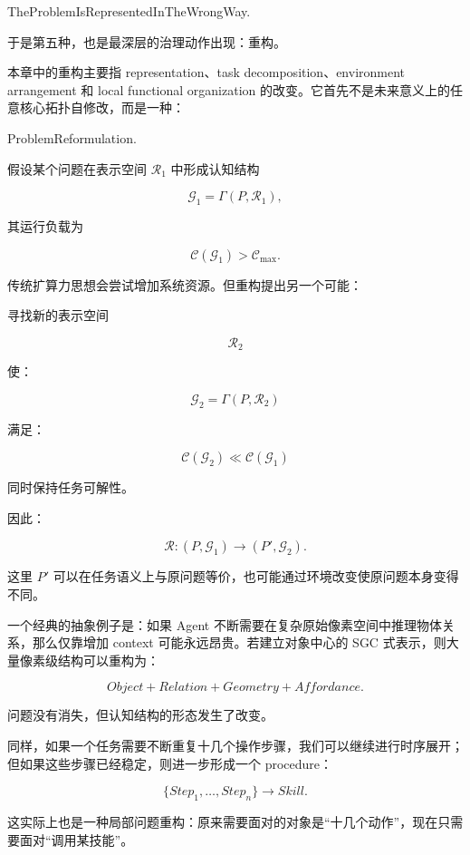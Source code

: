 \begin{statementbox}
TheProblemIsRepresentedInTheWrongWay.
\end{statementbox}

于是第五种，也是最深层的治理动作出现：重构。

本章中的重构主要指 representation、task decomposition、environment arrangement 和 local functional organization 的改变。它首先不是未来意义上的任意核心拓扑自修改，而是一种：

\begin{statementbox}
ProblemReformulation.
\end{statementbox}

假设某个问题在表示空间 $\mathcal R_1$ 中形成认知结构

\[
\mathcal G_1
=
\Gamma(P,\mathcal R_1),
\]

其运行负载为

\[
\mathcal C(\mathcal G_1)
>
\mathcal C_{\max}.
\]

传统扩算力思想会尝试增加系统资源。但重构提出另一个可能：

寻找新的表示空间

\[
\mathcal R_2
\]

使：

\[
\mathcal G_2
=
\Gamma(P,\mathcal R_2)
\]

满足：

\[
\boxed{
\mathcal C(\mathcal G_2)
\ll
\mathcal C(\mathcal G_1)
}
\]

同时保持任务可解性。

因此：

\[
\mathcal R:
(P,\mathcal G_1)
\rightarrow
(P',\mathcal G_2).
\]

这里 $P'$ 可以在任务语义上与原问题等价，也可能通过环境改变使原问题本身变得不同。

一个经典的抽象例子是：如果 Agent 不断需要在复杂原始像素空间中推理物体关系，那么仅靠增加 context 可能永远昂贵。若建立对象中心的 SGC 式表示，则大量像素级结构可以重构为：

\[
Object
+
Relation
+
Geometry
+
Affordance.
\]

问题没有消失，但认知结构的形态发生了改变。

同样，如果一个任务需要不断重复十几个操作步骤，我们可以继续进行时序展开；但如果这些步骤已经稳定，则进一步形成一个 procedure：

\[
\{Step_1,\ldots,Step_n\}
\rightarrow
Skill.
\]

这实际上也是一种局部问题重构：原来需要面对的对象是“十几个动作”，现在只需要面对“调用某技能”。

